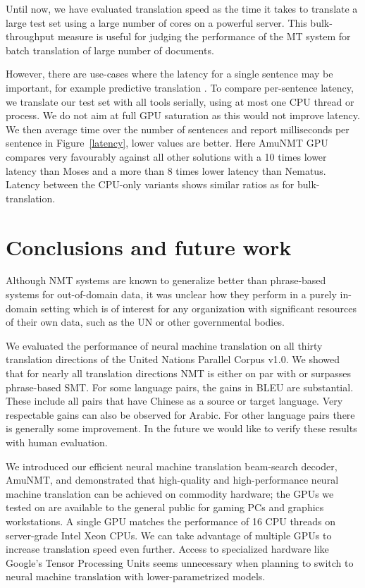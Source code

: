 \documentclass[11pt]{article}
\begin{document}
Until now, we have evaluated translation speed as the time it takes to translate a large test set using a large number of cores on a powerful server. This bulk-throughput measure is useful for judging the performance of the MT system for batch translation of large number of documents.
 
However, there are use-cases where the latency for a single sentence may be important, for example predictive translation \cite{Knowles}. 
To compare per-sentence latency, we translate our test set with all tools serially, using at most one CPU thread or process. We do not aim at full GPU saturation as this would not improve latency. We then average time over the number of sentences and report milliseconds per sentence in Figure~\ref{latency}, lower values are better. Here AmuNMT GPU compares very favourably against all other solutions with a 10 times lower latency than Moses and a more than 8 times lower latency than Nematus. Latency between the CPU-only variants shows similar ratios as for bulk-translation. 

\section{Conclusions and future work}

Although NMT systems are known to generalize better than phrase-based systems for out-of-domain data, it was unclear how they perform in a purely in-domain setting which is of interest for any organization with significant resources of their own data, such as the UN or other governmental bodies.

We evaluated the performance of neural machine translation on all thirty translation directions of the United Nations Parallel Corpus v1.0. We showed that for nearly all translation directions NMT is either on par with or surpasses phrase-based SMT. For some language pairs, the gains in BLEU are substantial. These include all pairs that have Chinese as a source or target language. Very respectable gains can also be observed for Arabic. For other language pairs there is generally some improvement.  In the future we would like to verify these results with human evaluation.

We introduced our efficient neural machine translation beam-search decoder, AmuNMT, and demonstrated that high-quality and high-performance neural machine translation can be achieved on commodity hardware; the GPUs we tested on are available to the general public for gaming PCs and graphics workstations. A single GPU matches the performance of 16 CPU threads on server-grade Intel Xeon CPUs. We can take advantage of multiple GPUs to increase translation speed even further. Access to specialized hardware like Google's Tensor Processing Units seems unnecessary when planning to switch to neural machine translation with lower-parametrized models. 
\end{document}
